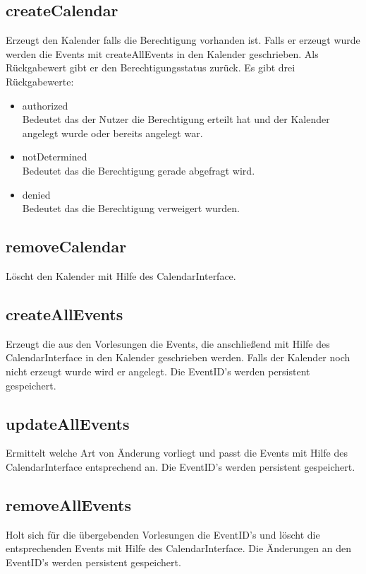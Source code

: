 \subsection{createCalendar}
Erzeugt den Kalender falls die Berechtigung vorhanden ist. Falls er erzeugt wurde werden die Events mit createAllEvents in den Kalender geschrieben. Als Rückgabewert gibt er den Berechtigungsstatus zurück. Es gibt drei Rückgabewerte:
\begin{itemize}
     \item authorized \\[0.5em]
     Bedeutet das der Nutzer die Berechtigung erteilt hat und der Kalender angelegt wurde oder bereits angelegt war.
     \item notDetermined \\[0.5em]
     Bedeutet das die Berechtigung gerade abgefragt wird.
     \item denied \\[0.5em]
     Bedeutet das die Berechtigung verweigert wurden.
\end{itemize}

\subsection{removeCalendar}
Löscht den Kalender mit Hilfe des CalendarInterface.

\subsection{createAllEvents}
Erzeugt die aus den Vorlesungen die Events, die anschließend mit Hilfe des CalendarInterface in den Kalender geschrieben werden.
Falls der Kalender noch nicht erzeugt wurde wird er angelegt.
Die EventID's werden persistent gespeichert.

\subsection{updateAllEvents}
Ermittelt welche Art von Änderung vorliegt und passt die Events mit Hilfe des CalendarInterface entsprechend an.
Die EventID's werden persistent gespeichert.

\subsection{removeAllEvents}
Holt sich für die übergebenden Vorlesungen die EventID's und löscht die entsprechenden Events mit Hilfe des CalendarInterface.
Die Änderungen an den EventID's werden persistent gespeichert.

